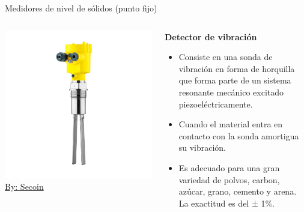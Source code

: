 \documentclass[aspectratio=169]{beamer}
\begin{document}
\begin{frame}{Medidores de nivel de sólidos (punto fijo)}
    \begin{columns}[c, onlytextwidth]
        \begin{column}{0.5\textwidth}
                \centering
            \includegraphics[width = 0.9\linewidth]{fig/Nivel/vibracion.png}\\ \tiny{\href{https://www.secoin.com.uy/productos/}{By: Secoin}}
        \end{column}
        
        \begin{column}{0.50\textwidth}
        \textbf{Detector de vibración}
            \begin{itemize}
                \item Consiste en una sonda de vibración en forma de horquilla que forma parte de un sistema resonante mecánico excitado piezoeléctricamente.
                \item Cuando el material entra en contacto con la sonda amortigua su vibración.
                \item Es adecuado para una gran variedad de polvos, carbon, azúcar, grano, cemento y arena. La exactitud es del ± 1\%.
                
            \end{itemize}
        
        \end{column}
    \end{columns}
\end{frame} 
\end{document}
